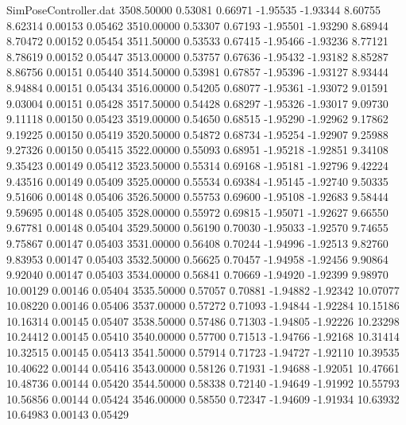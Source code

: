 \begin{filecontents}{SimPoseController.dat}
3508.50000    0.53081    0.66971    -1.95535   -1.93344    8.60755    8.62314    0.00153    0.05462
3510.00000    0.53307    0.67193    -1.95501   -1.93290    8.68944    8.70472    0.00152    0.05454
3511.50000    0.53533    0.67415    -1.95466   -1.93236    8.77121    8.78619    0.00152    0.05447
3513.00000    0.53757    0.67636    -1.95432   -1.93182    8.85287    8.86756    0.00151    0.05440
3514.50000    0.53981    0.67857    -1.95396   -1.93127    8.93444    8.94884    0.00151    0.05434
3516.00000    0.54205    0.68077    -1.95361   -1.93072    9.01591    9.03004    0.00151    0.05428
3517.50000    0.54428    0.68297    -1.95326   -1.93017    9.09730    9.11118    0.00150    0.05423
3519.00000    0.54650    0.68515    -1.95290   -1.92962    9.17862    9.19225    0.00150    0.05419
3520.50000    0.54872    0.68734    -1.95254   -1.92907    9.25988    9.27326    0.00150    0.05415
3522.00000    0.55093    0.68951    -1.95218   -1.92851    9.34108    9.35423    0.00149    0.05412
3523.50000    0.55314    0.69168    -1.95181   -1.92796    9.42224    9.43516    0.00149    0.05409
3525.00000    0.55534    0.69384    -1.95145   -1.92740    9.50335    9.51606    0.00148    0.05406
3526.50000    0.55753    0.69600    -1.95108   -1.92683    9.58444    9.59695    0.00148    0.05405
3528.00000    0.55972    0.69815    -1.95071   -1.92627    9.66550    9.67781    0.00148    0.05404
3529.50000    0.56190    0.70030    -1.95033   -1.92570    9.74655    9.75867    0.00147    0.05403
3531.00000    0.56408    0.70244    -1.94996   -1.92513    9.82760    9.83953    0.00147    0.05403
3532.50000    0.56625    0.70457    -1.94958   -1.92456    9.90864    9.92040    0.00147    0.05403
3534.00000    0.56841    0.70669    -1.94920   -1.92399    9.98970   10.00129    0.00146    0.05404
3535.50000    0.57057    0.70881    -1.94882   -1.92342   10.07077   10.08220    0.00146    0.05406
3537.00000    0.57272    0.71093    -1.94844   -1.92284   10.15186   10.16314    0.00145    0.05407
3538.50000    0.57486    0.71303    -1.94805   -1.92226   10.23298   10.24412    0.00145    0.05410
3540.00000    0.57700    0.71513    -1.94766   -1.92168   10.31414   10.32515    0.00145    0.05413
3541.50000    0.57914    0.71723    -1.94727   -1.92110   10.39535   10.40622    0.00144    0.05416
3543.00000    0.58126    0.71931    -1.94688   -1.92051   10.47661   10.48736    0.00144    0.05420
3544.50000    0.58338    0.72140    -1.94649   -1.91992   10.55793   10.56856    0.00144    0.05424
3546.00000    0.58550    0.72347    -1.94609   -1.91934   10.63932   10.64983    0.00143    0.05429

\end{filecontents}

